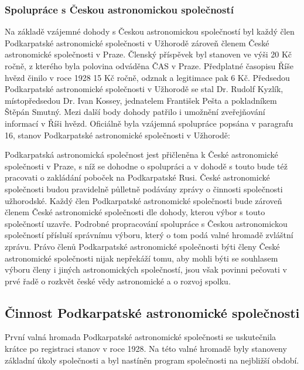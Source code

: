 \documentclass[10pt,a5paper,twoside]{book}
\begin{document}
\subsubsection*{Spolupráce s Českou astronomickou společností}
\par Na základě vzájemné dohody s Českou astronomickou společností byl každý člen Podkarpatské astronomické společnosti v Užhorodě zároveň členem České astronomické společnosti v Praze. Členský příspěvek byl stanoven ve výši 20 Kč ročně, z kterého byla polovina odváděna ČAS v Praze. Předplatné časopisu Říše hvězd činilo v roce 1928 15 Kč ročně, odznak a legitimace pak 6 Kč. Předsedou Podkarpatské astronomické společnosti v Užhorodě se stal Dr. Rudolf Kyzlík, místopředsedou Dr. Ivan Kossey, jednatelem František Pešta a pokladníkem Štěpán Smutný. Mezi další body dohody patřilo i umožnění zveřejňování informací v Říši hvězd. Oficiálně byla vzájemná spolupráce popsána v paragrafu 16, stanov Podkarpatské astronomické společnosti v Užhorodě:
\par Podkarpatská astronomická společnost jest přičleněna k České astronomické společnosti v Praze, s níž se dohodne o spolupráci a v dohodě s touto bude též pracovati o zakládání poboček na Podkarpatské Rusi. České astronomické společnosti budou pravidelně půlletně podávány zprávy o činnosti společnosti užhorodské. Každý člen Podkarpatské astronomické společnosti bude zároveň členem České astronomické společnosti dle dohody, kterou výbor s touto společností uzavře. Podrobné propracování spolupráce s Českou astronomickou společností přísluší správnímu výboru, který o tom podá valné hromadě zvláštní zprávu. Právo členů Podkarpatské astronomické společnosti býti členy České astronomické společnosti nijak nepřekáží tomu, aby mohli býti se souhlasem výboru členy i jiných astronomických společností, jsou však povinni pečovati v prvé řadě o rozkvět české vědy astronomické a o rozvoj spolku. 
    \newpage

\subsection*{Činnost Podkarpatské astronomické společnosti}
\par První valná hromada Podkarpatské astronomické společnosti se uskutečnila krátce po registraci stanov v roce 1928. Na této valné hromadě byly stanoveny základní úkoly společnosti a byl nastíněn program společnosti na nejbližší období.
\end{document}
